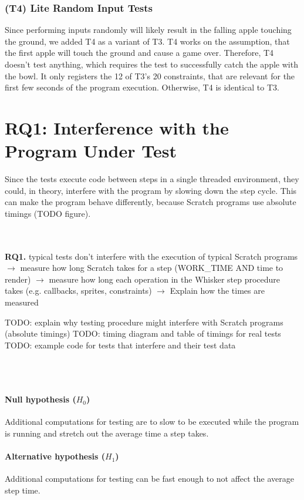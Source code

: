 \subsubsection{(T4) Lite Random Input Tests}

Since performing inputs randomly will likely result in the falling apple touching the ground,
we added T4 as a variant of T3.
T4 works on the assumption, that the first apple will touch the ground and cause a game over.
Therefore, T4 doesn't test anything, which requires the test to successfully catch the apple with the bowl.
It only registers the 12 of T3's 20 constraints, that are relevant for the first few seconds of the program execution.
Otherwise, T4 is identical to T3.

\section{RQ1: Interference with the Program Under Test}

Since the tests execute code between steps in a single threaded environment,
they could, in theory, interfere with the program by slowing down the step cycle.
This can make the program behave differently, because Scratch programs use absolute timings (TODO figure).

~\\~\\
\textbf{RQ1.} typical tests don't interfere with the execution of typical Scratch programs
$\rightarrow$ measure how long Scratch takes for a step (WORK\_TIME AND time to render)
$\rightarrow$ measure how long each operation in the Whisker step procedure takes (e.g. callbacks, sprites, constraints)
$\rightarrow$ Explain how the times are measured

TODO: explain why testing procedure might interfere with Scratch programs (absolute timings)
TODO: timing diagram and table of timings for real tests
TODO: example code for tests that interfere and their test data

~\\~\\
\paragraph{Null hypothesis ($H_0$)}
Additional computations for testing are to slow to be executed while the program is running and stretch out the average time a step takes.
\paragraph{Alternative hypothesis ($H_1$)}
Additional computations for testing can be fast enough to not affect the average step time.

